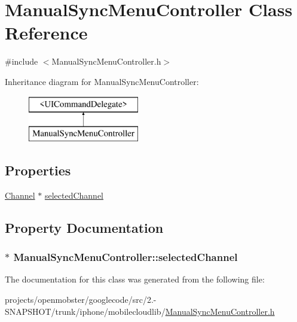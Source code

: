 \hypertarget{interface_manual_sync_menu_controller}{
\section{\-Manual\-Sync\-Menu\-Controller \-Class \-Reference}
\label{interface_manual_sync_menu_controller}
}


{\ttfamily \#include $<$\-Manual\-Sync\-Menu\-Controller.\-h$>$}

\-Inheritance diagram for \-Manual\-Sync\-Menu\-Controller\-:\begin{figure}[H]
\begin{center}
\leavevmode
\includegraphics[height=2.000000cm]{interface_manual_sync_menu_controller}
\end{center}
\end{figure}
\subsection*{\-Properties}
\begin{DoxyCompactItemize}
\item 
\hyperlink{interface_channel}{\-Channel} $\ast$ \hyperlink{interface_manual_sync_menu_controller_ab85bb7b200b371b33eae77135a05f0a4}{selected\-Channel}
\end{DoxyCompactItemize}


\subsection{\-Property \-Documentation}
\hypertarget{interface_manual_sync_menu_controller_ab85bb7b200b371b33eae77135a05f0a4}{
\subsubsection[{selected\-Channel}]{ $\ast$ \-Manual\-Sync\-Menu\-Controller\-::selected\-Channel}}
\label{interface_manual_sync_menu_controller_ab85bb7b200b371b33eae77135a05f0a4}


\-The documentation for this class was generated from the following file\-:\begin{DoxyCompactItemize}
\item 
projects/openmobster/googlecode/src/2.-\/\-S\-N\-A\-P\-S\-H\-O\-T/trunk/iphone/mobilecloudlib/\hyperlink{_manual_sync_menu_controller_8h}{\-Manual\-Sync\-Menu\-Controller.\-h}\end{DoxyCompactItemize}

